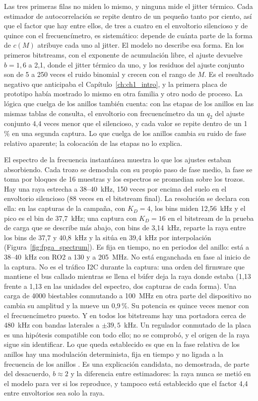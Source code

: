 Las tres primeras filas no miden lo mismo, y ninguna mide el jitter
térmico. Cada estimador de autocorrelación se repite dentro de un pequeño
tanto por ciento, así que el factor que hay entre ellos, de tres a cuatro
en el envoltorio silencioso y de quince con el frecuencímetro,
es sistemático: depende de cuánta parte de la forma de $c(M)$ atribuye
cada uno al jitter. El modelo no describe esa forma. En los primeros
bitstreams, con el exponente de acumulación libre, el ajuste devuelve
$b = 1{,}6$ a 2,1, donde el jitter térmico da uno, y los residuos del
ajuste conjunto son de 5 a 250 veces el ruido binomial y crecen con el
rango de $M$. Es el resultado negativo que anticipaba el
Capítulo~\ref{ch:ch1_intro}, y la primera placa de prototipo había
mostrado lo mismo en otra familia y otro nodo de proceso. La lógica que
cuelga de los anillos también cuenta: con las etapas de los anillos en
las mismas tablas de consulta, el envoltorio con frecuencímetro da un
$q_2$ del ajuste conjunto 4,4 veces menor que el silencioso, y cada valor
se repite dentro de un 1\,\% en una segunda captura. Lo que cuelga de los
anillos cambia su ruido de fase relativo aparente; la colocación de las
etapas no lo explica.

El espectro de la frecuencia instantánea muestra lo que los ajustes
estaban absorbiendo. Cada trozo se demodula con su propio paso de fase
medio, la fase se toma por bloques de 16 muestras y los espectros se
promedian sobre los trozos. Hay una raya estrecha a 38--40~kHz, 150
veces por encima del suelo en el envoltorio silencioso (88 veces en el
bitstream final). La resolución se declara con ella: en las capturas de
la campaña, con $K_D = 4$, los bins miden 12,56~kHz y el pico es el bin
de 37,7~kHz; una captura con $K_D = 16$ en el bitstream de la prueba de
carga que se describe más abajo, con bins de 3,14~kHz, reparte la raya
entre los bins de 37,7 y 40,8~kHz y la sitúa en 39,4~kHz por
interpolación (Figura~\ref{fig:fpga_spectrum}). Es fija
en tiempo, no en periodos del anillo: está a 38--40~kHz con RO2 a 130 y a
205~MHz. No está enganchada en fase al inicio de la captura. No es el
tráfico \ac{I2C} durante la captura: una orden del firmware que mantiene
el bus callado mientras se llena el búfer deja la raya donde estaba (1,13
frente a 1,13 en las unidades del espectro, dos capturas de cada forma).
Una carga de 4000 biestables conmutando a 100~MHz en otra parte del
dispositivo no cambia su amplitud y la mueve un 0,9\,\%. Su potencia es
quince veces menor con el frecuencímetro puesto. Y en todos los
bitstreams hay una portadora cerca de 480~kHz con bandas laterales a
$\pm39{,}5$~kHz. Un regulador conmutado de la placa es una hipótesis
compatible con todo ello; no se comprobó, y el origen de la raya sigue
sin identificar. Lo que queda establecido es que en la fase relativa de
los anillos hay una modulación determinista, fija en tiempo y no ligada
a la frecuencia de los anillos \meas{}. Es una explicación candidata, no
demostrada, de parte del desacuerdo, $b \approx 2$ y la diferencia entre
estimadores: la raya nunca se metió en el modelo para ver si los
reproduce, y tampoco está establecido que el factor 4,4 entre
envoltorios sea solo la raya.

